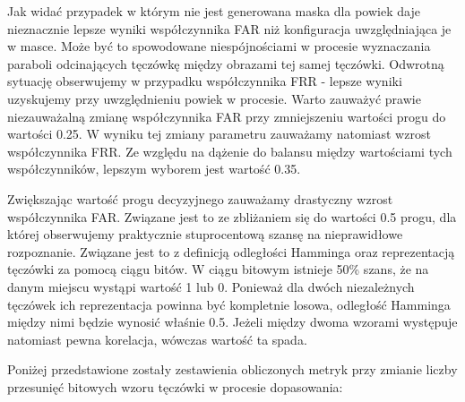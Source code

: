 Jak wida\'c przypadek w którym nie jest generowana maska dla powiek daje nieznacznie lepsze wyniki
współczynnika FAR niż konfiguracja uwzględniająca je w masce. Może by\'c to spowodowane niespójnościami
w procesie wyznaczania paraboli odcinających tęczówkę między obrazami tej samej tęczówki. Odwrotną sytuację
obserwujemy w przypadku współczynnika FRR - lepsze wyniki uzyskujemy przy uwzględnieniu powiek w procesie.
Warto zauważy\'c prawie niezauważalną zmianę współczynnika FAR przy zmniejszeniu wartości progu do wartości 0.25.
W wyniku tej zmiany parametru zauważamy natomiast wzrost współczynnika FRR. Ze względu na dążenie do balansu
między wartościami tych współczynników, lepszym wyborem jest wartoś\'c 0.35.

Zwiększając wartoś\'c progu decyzyjnego zauważamy drastyczny wzrost współczynnika FAR. Związane jest to ze zbliżaniem
się do wartości 0.5 progu, dla której obserwujemy praktycznie stuprocentową szansę na nieprawidłowe rozpoznanie.
Związane jest to z definicją odległości Hamminga oraz reprezentacją tęczówki za pomocą ciągu bitów. W ciągu bitowym
istnieje 50\% szans, że na danym miejscu wystąpi wartoś\'c 1 lub 0. Ponieważ dla dwóch niezależnych tęczówek
ich reprezentacja powinna by\'c kompletnie losowa, odległoś\'c Hamminga między nimi będzie wynosi\'c właśnie 0.5.
Jeżeli między dwoma wzorami występuje natomiast pewna korelacja, wówczas wartoś\'c ta spada.\newline

\noindent
Poniżej przedstawione zostały zestawienia obliczonych metryk przy zmianie liczby przesunię\'c bitowych
wzoru tęczówki w procesie dopasowania:

